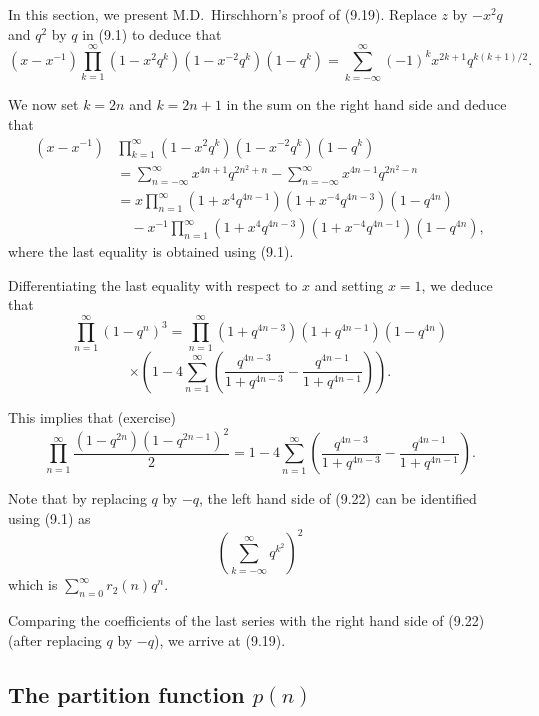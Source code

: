 \documentclass{article}
\begin{document}
In this section, we present M.D.\ Hirschhorn's proof of (9.19). Replace $z$ by
$-x^2 q$ and $q^2$ by $q$ in (9.1) to deduce that
\begin{equation}
(x - x^{-1})\prod_{k=1}^{\infty}(1-x^2 q^k)(1-x^{-2}q^k)(1-q^k) = \sum_{k=-\infty}^{\infty}(-1)^k x^{2k+1} q^{k(k+1)/2}.
\tag{9.20}
\end{equation}

We now set $k = 2n$ and $k = 2n+1$ in the sum on the right hand side and deduce that
\begin{align*}
(x - x^{-1})&\prod_{k=1}^{\infty}(1-x^2 q^k)(1-x^{-2}q^k)(1-q^k) \\
&= \sum_{n=-\infty}^{\infty} x^{4n+1} q^{2n^2+n} - \sum_{n=-\infty}^{\infty} x^{4n-1} q^{2n^2-n} \\
&= x\prod_{n=1}^{\infty}(1+x^4 q^{4n-1})(1+x^{-4}q^{4n-3})(1-q^{4n}) \\
&\quad - x^{-1}\prod_{n=1}^{\infty}(1+x^4 q^{4n-3})(1+x^{-4}q^{4n-1})(1-q^{4n}),
\end{align*}
where the last equality is obtained using (9.1).

Differentiating the last equality with respect to $x$ and setting $x = 1$, we deduce that
\begin{equation}
\prod_{n=1}^{\infty}(1-q^n)^3 = \prod_{n=1}^{\infty}(1+q^{4n-3})(1+q^{4n-1})(1-q^{4n})
\tag{9.21}
\end{equation}
\[
\times \left(1 - 4\sum_{n=1}^{\infty}\left(\frac{q^{4n-3}}{1+q^{4n-3}} - \frac{q^{4n-1}}{1+q^{4n-1}}\right)\right).
\]

This implies that (exercise)
\begin{equation}
\prod_{n=1}^{\infty}\frac{(1-q^{2n})(1-q^{2n-1})^2}{2} = 1 - 4\sum_{n=1}^{\infty}\left(\frac{q^{4n-3}}{1+q^{4n-3}} - \frac{q^{4n-1}}{1+q^{4n-1}}\right).
\tag{9.22}
\end{equation}

Note that by replacing $q$ by $-q$, the left hand side of (9.22) can be identified
using (9.1) as
\[
\left(\sum_{k=-\infty}^{\infty} q^{k^2}\right)^2
\]
which is $\sum_{n=0}^{\infty} r_2(n) q^n$.

Comparing the coefficients of the last series with the right hand side of (9.22)
(after replacing $q$ by $-q$), we arrive at (9.19).

\subsection{The partition function $p(n)$}
\end{document}
